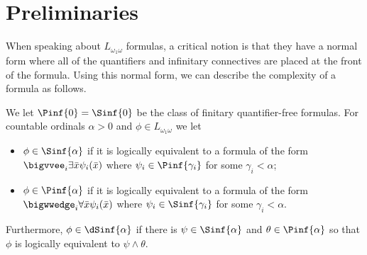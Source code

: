\documentclass[10pt,a4paper]{amsart}
\renewcommand{\-}{\text{-}}
\begin{document}
\section{Preliminaries}
When speaking about $L_{\omega_1\omega}$ formulas, a critical notion is that they have a normal form where all of the quantifiers and infinitary connectives are placed at the front of the formula.
Using this normal form, we can describe the complexity of a formula as follows.

\begin{definition}
	We let $\Pinf{0}=\Sinf{0}$ be the class of finitary quantifier-free formulas. For countable ordinals $\alpha>0$ and $\phi\in L_{\omega_1\omega}$ we let 
	\begin{itemize}
		\item $\phi\in \Sinf{\alpha}$ if it is logically equivalent to a formula of the form $\bigvvee_i \exists \bar x\psi_i(\bar x)$ where $\psi_i\in \Pinf{\gamma_i}$ for some $\gamma_i<\alpha$;
		\item $\phi\in \Pinf{\alpha}$ if it is logically equivalent to a formula of the form $\bigwwedge_i \forall\bar x\psi_i(\bar x)$ where $\psi_i\in \Sinf{\gamma_i}$ for some $\gamma_i<\alpha$.
	\end{itemize}
	Furthermore, $\phi\in \dSinf{\alpha}$ if there is $\psi\in \Sinf{\alpha}$ and $\theta\in \Pinf{\alpha}$ so that $\phi$ is logically equivalent to $\psi\land \theta$.
\end{definition}
\end{document}
